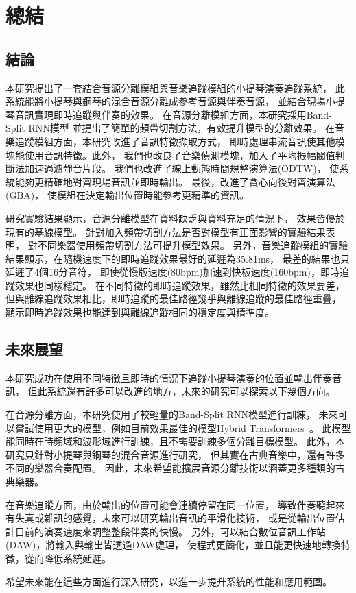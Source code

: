 \documentclass[class=NCU_thesis, crop=false]{standalone}
\begin{document}
\chapter{總結}

\section{結論}
本研究提出了一套結合音源分離模組與音樂追蹤模組的小提琴演奏追蹤系統，
此系統能將小提琴與鋼琴的混合音源分離成參考音源與伴奏音源，
並結合現場小提琴音訊實現即時追蹤與伴奏的效果。
在音源分離模組方面，本研究採用Band-Split RNN模型
並提出了簡單的頻帶切割方法，有效提升模型的分離效果。
在音樂追蹤模組方面，本研究改進了音訊特徵擷取方式，
即時處理串流音訊使其他模塊能使用音訊特徵。此外，
我們也改良了音樂偵測模塊，加入了平均振幅閥值判斷法加速過濾靜音片段。
我們也改進了線上動態時間規整演算法(ODTW)，
使系統能夠更精確地對齊現場音訊並即時輸出。
最後，改進了貪心向後對齊演算法(GBA)，
使模組在決定輸出位置時能參考更精準的資訊。

研究實驗結果顯示，音源分離模型在資料缺乏與資料充足的情況下，
效果皆優於現有的基線模型。
針對加入頻帶切割方法是否對模型有正面影響的實驗結果表明，
對不同樂器使用頻帶切割方法可提升模型效果。
另外，音樂追蹤模組的實驗結果顯示，在隨機速度下的即時追蹤效果最好的延遲為35.81ms，
最差的結果也只延遲了4個16分音符，
即使從慢版速度(80bpm)加速到快板速度(160bpm)，即時追蹤效果也同樣穩定。
在不同特徵的即時追蹤效果，雖然比相同特徵的效果要差，
但與離線追蹤效果相比，即時追蹤的最佳路徑幾乎與離線追蹤的最佳路徑重疊，
顯示即時追蹤效果也能達到與離線追蹤相同的穩定度與精準度。

\pagebreak

\section{未來展望}
本研究成功在使用不同特徵且即時的情況下追蹤小提琴演奏的位置並輸出伴奏音訊，
但此系統還有許多可以改進的地方，未來的研究可以探索以下幾個方向。

在音源分離方面，本研究使用了較輕量的Band-Split RNN模型進行訓練，
未來可以嘗試使用更大的模型，例如目前效果最佳的模型Hybrid Transformers~\cite{rouard2023hybrid}。
此模型能同時在時頻域和波形域進行訓練，且不需要訓練多個分離目標模型。
此外，本研究只針對小提琴與鋼琴的混合音源進行研究，
但其實在古典音樂中，還有許多不同的樂器合奏配置。
因此，未來希望能擴展音源分離技術以涵蓋更多種類的古典樂器。

在音樂追蹤方面，由於輸出的位置可能會連續停留在同一位置，
導致伴奏聽起來有失真或雜訊的感覺，未來可以研究輸出音訊的平滑化技術，
或是從輸出位置估計目前的演奏速度來調整整段伴奏的快慢。
另外，可以結合數位音訊工作站(DAW)，將輸入與輸出皆透過DAW處理，
使程式更簡化，並且能更快速地轉換特徵，從而降低系統延遲。

希望未來能在這些方面進行深入研究，以進一步提升系統的性能和應用範圍。


\end{document}
